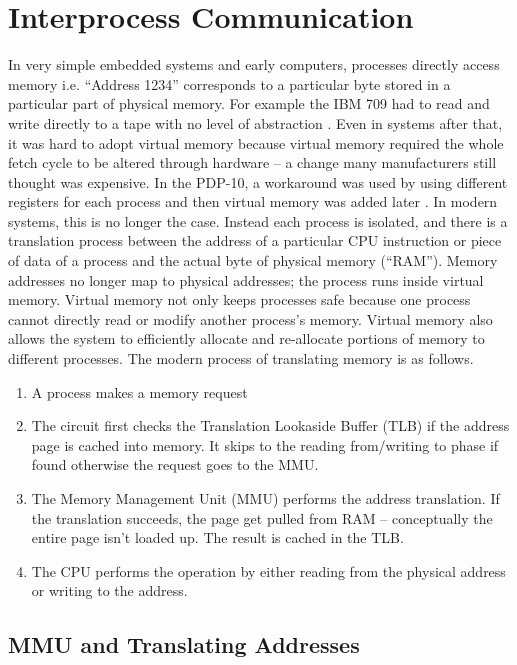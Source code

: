 \chapter{Interprocess Communication}


In very simple embedded systems and early computers, processes directly access memory i.e. ``Address 1234'' corresponds to a particular byte stored in a particular part of physical memory.
For example the IBM 709 had to read and write directly to a tape with no level of abstraction \cite[P. 65]{ibm709}. Even in systems after that, it was hard to adopt virtual memory because virtual memory required the whole fetch cycle to be altered through hardware -- a change many manufacturers still thought was expensive.
In the PDP-10, a workaround was used by using different registers for each process and then virtual memory was added later \cite{ricm}.
In modern systems, this is no longer the case. Instead each process is isolated, and there is a translation process between the address of a particular CPU instruction or piece of data of a process and the actual byte of physical memory (``RAM'').
Memory addresses no longer map to physical addresses; the process runs inside virtual memory. Virtual memory not only keeps processes safe because one process cannot directly read or modify another process's memory.
Virtual memory also allows the system to efficiently allocate and re-allocate portions of memory to different processes.
The modern process of translating memory is as follows.

\begin{enumerate}
\item A process makes a memory request
\item The circuit first checks the Translation Lookaside Buffer (TLB) if the address page is cached into memory. It skips to the reading from/writing to phase if found otherwise the request goes to the MMU.
\item The Memory Management Unit (MMU) performs the address translation. If the translation succeeds, the page get pulled from RAM -- conceptually the entire page isn't loaded up. The result is cached in the TLB.
\item The CPU performs the operation by either reading from the physical address or writing to the address.
\end{enumerate}

\section{MMU and Translating Addresses}

